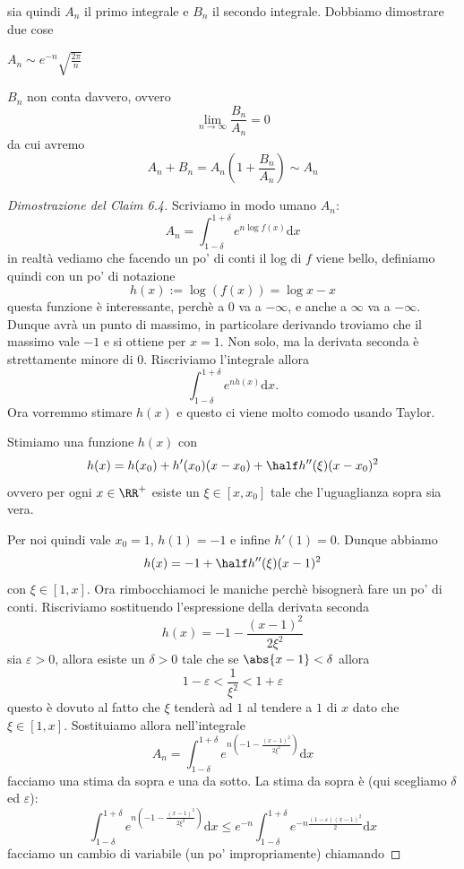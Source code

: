 \documentclass[11pt]{scrartcl}
\begin{document}
  sia quindi $A_n$ il primo integrale e $B_n$ il secondo integrale. Dobbiamo dimostrare due cose
  \begin{claim}
  	$A_n\sim e^{-n}\sqrt{\frac{2\pi}{n}}$
  \end{claim}
  \begin{claim}
  	$B_n$ non conta davvero, ovvero
  	$$\lim_{n\to \infty}\frac{B_n}{A_n}=0$$
  	da cui avremo
  	$$A_n+B_n=A_n\left(1+\frac{B_n}{A_n}\right)\sim A_n$$
  \end{claim}
  \begin{proof}[Dimostrazione del Claim 6.4]
  	Scriviamo in modo umano $A_n$:
  	$$A_n=\int_{1-\delta}^{1+\delta}e^{n\log f(x)}\text{d}x$$
  	in realtà vediamo che facendo un po' di conti il log di $f$ viene bello, definiamo quindi con un po' di notazione
  	$$h(x):=\log(f(x))=\log x - x$$
  	questa funzione è interessante, perchè a $0$ va a $-\infty$, e anche a $\infty$ va a $-\infty$. Dunque avrà un punto di massimo, in particolare derivando troviamo che il massimo vale $-1$ e si ottiene per $x=1$. Non solo, ma la derivata seconda è strettamente minore di $0$. Riscriviamo l'integrale allora
  	$$\int_{1-\delta}^{1+\delta}e^{nh(x)}\text{d}x.$$
  	Ora vorremmo stimare $h(x)$ e questo ci viene molto comodo usando Taylor.
  	\begin{theorem}
  		Stimiamo una funzione $h(x)$ con 
  		$$h(x)=h(x_0)+h'(x_0)(x-x_0)+\half h''(\xi)(x-x_0)^2$$
  		ovvero per ogni $x\in\RR^+$ esiste un $\xi \in[x,x_0]$ tale che l'uguaglianza sopra sia vera. 
  	\end{theorem}
  	Per noi quindi vale $x_0=1$, $h(1)=-1$ e infine $h'(1)=0$. Dunque abbiamo 
  	$$h(x)=-1+\half h''(\xi)(x-1)^2$$
  	con $\xi \in [1,x]$. Ora rimbocchiamoci le maniche perchè bisognerà fare un po' di conti. Riscriviamo sostituendo l'espressione della derivata seconda
  	$$h(x)=-1-\frac{(x-1)^2}{2\xi^2}$$
  	sia $\varepsilon>0$, allora esiste un $\delta>0$ tale che se $\abs{x-1}<\delta$ allora 
  	$$1-\varepsilon<\frac{1}{\xi^2}<1+\varepsilon$$
  	questo è dovuto al fatto che $\xi$ tenderà ad $1$ al tendere a $1$ di $x$ dato che $\xi \in [1,x]$. Sostituiamo allora nell'integrale
  	$$A_n=\int_{1-\delta}^{1+\delta}e^{n\left(-1-\frac{(x-1)^2}{2\xi^2}\right)}\text{d}x$$
  	facciamo una stima da sopra e una da sotto. La stima da sopra è (qui scegliamo $\delta$ ed $\varepsilon$):
  	$$\int_{1-\delta}^{1+\delta}e^{n\left(-1-\frac{(x-1)^2}{2\xi^2}\right)}\text{d}x\le e^{-n}\int_{1-\delta}^{1+\delta}e^{-n\frac{(1-\varepsilon)(x-1)^2}{2}}\text{d}x$$
  	facciamo un cambio di variabile (un po' impropriamente) chiamando

\end{proof}
\end{document}
